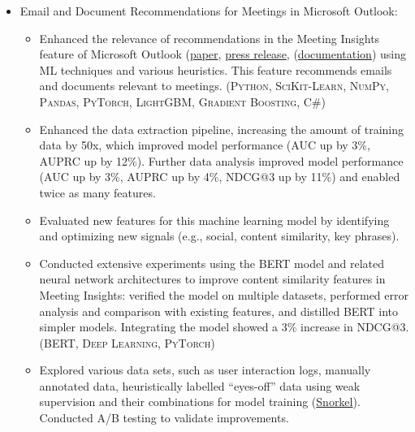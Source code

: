 \documentclass{article}
\newcommand{\mytexttilde}{\raisebox{0.5ex}{\texttildelow}}
\begin{document}
\begin{itemize}
\begin{itemize}
  \end{itemize}

\item Email and Document Recommendations for Meetings in Microsoft Outlook:

  \begin{itemize}

  \item Enhanced the relevance of recommendations in the Meeting Insights feature of Microsoft Outlook (\href{https://www.microsoft.com/en-us/research/publication/calendar-aware-proactive-email-recommendation/}{paper}, \href{https://www.microsoft.com/en-us/research/blog/the-story-of-an-office-ai-feature-how-ai-can-promote-efficient-meeting-preparation/}{press release}, (\href{https://support.microsoft.com/en-gb/office/use-intelligent-technology-in-outlook-on-the-web-and-outlook-com-24b30683-8340-4b69-b8ac-4193ec528a70}{documentation}) using ML techniques and various heuristics. This feature recommends emails and documents relevant to meetings. (\textsc{Python}, \textsc{SciKit-Learn}, \textsc{NumPy}, \textsc{Pandas}, \textsc{PyTorch}, \textsc{LightGBM}, \textsc{Gradient Boosting}, \textsc{C\#})

  \item Enhanced the data extraction pipeline, increasing the amount of training data by \mytexttilde 50x, which improved model performance (AUC up by 3\%, AUPRC up by 12\%). Further data analysis improved model performance (AUC up by 3\%, AUPRC up by 4\%, NDCG@3 up by 11\%) and enabled twice as many features.

  \item Evaluated new features for this machine learning model by identifying and optimizing new signals (e.g., social, content similarity, key phrases).

  \item Conducted extensive experiments using the \textsc{BERT} model and related neural network architectures to improve content similarity features in Meeting Insights: verified the model on multiple datasets, performed error analysis and comparison with existing features, and distilled BERT into simpler models. Integrating the model showed a 3\% increase in NDCG@3. (\textsc{BERT}, \textsc{Deep Learning}, \textsc{PyTorch})

  \item Explored various data sets, such as user interaction logs, manually annotated data, heuristically labelled ``eyes-off'' data using weak supervision and their combinations for model training (\href{https://snorkel.ai/}{Snorkel}). Conducted A/B testing to validate improvements.


\end{itemize}
\end{itemize}
\end{document}
